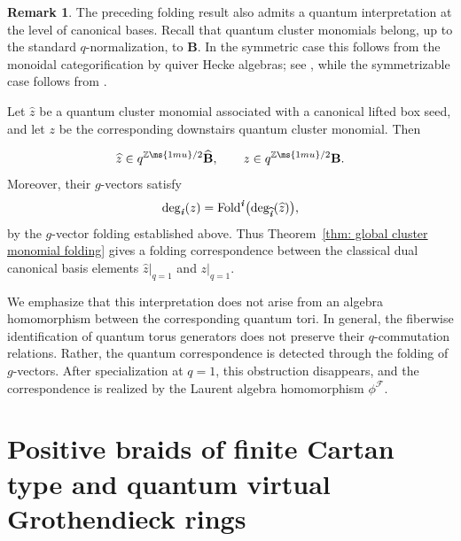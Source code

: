 \documentclass[12pt, leqno]{amsart}
\numberwithin{equation}{section}
\theoremstyle{plain}
\theoremstyle{definition}
\newtheorem{remark}[lemma]{Remark}
\newcommand{\Z}{\mathbb{Z}\ms{1mu}}
\newcommand{\Fold}{{\rm Fold}}
\newcommand{\ii}{ \textbf{\textit{i}}}
\newcommand{\hz}{\widehat{z}}
\newcommand{\hii}{{\widehat{\ii}}}
\newcommand{\bfB}{\mathbf{B}}
\newcommand{\hbfB}{\widehat{\bfB}}
\newcommand{\calF}{\mathcal{F}}
\begin{document}
\begin{remark}\label{rem: canonical basis interpretation}
The preceding folding result also admits a quantum interpretation at
the level of canonical bases.  Recall that quantum cluster monomials
belong, up to the standard $q$-normalization, to $\bfB$.
In the symmetric case this follows from the monoidal categorification
by quiver Hecke algebras; see \cite{KKKO18}, while the symmetrizable
case follows from \cite{Qin20}.

Let $\hz$ be a quantum cluster monomial associated with a canonical
lifted box seed, and let $z$ be the corresponding downstairs quantum
cluster monomial.  Then


\[
\hz\in q^{\Z/2}\hbfB,\qquad z\in q^{\Z/2}\bfB.
\]
Moreover, their $g$-vectors satisfy
\[
\deg_\ii(z) = \Fold^\ii\bigl(\deg_\hii(\hz)\bigr),
\]
by the $g$-vector folding established above.
Thus Theorem~\ref{thm: global cluster monomial folding} gives a
  folding correspondence between the classical dual canonical basis
  elements $\hz|_{q=1}$ and $z|_{q=1}$.

We emphasize that this interpretation does not arise from an algebra
homomorphism between the corresponding quantum tori.  In general, the
fiberwise identification of quantum torus generators does not preserve
their $q$-commutation relations.  Rather, the quantum correspondence is
detected through the folding of $g$-vectors.  After specialization at
$q=1$, this obstruction disappears, and the correspondence is realized
by the Laurent algebra homomorphism $\phi^\calF$.
\end{remark}































\section{Positive braids of finite Cartan type and quantum virtual
Grothendieck rings}
\label{sec: finite case}
\end{document}
